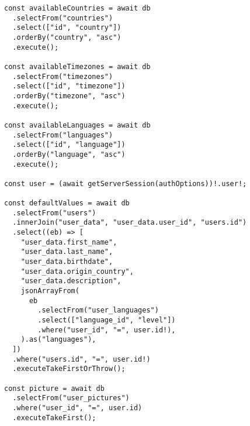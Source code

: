 
\begin{verbatim}
const availableCountries = await db
  .selectFrom("countries")
  .select(["id", "country"])
  .orderBy("country", "asc")
  .execute();

const availableTimezones = await db
  .selectFrom("timezones")
  .select(["id", "timezone"])
  .orderBy("timezone", "asc")
  .execute();

const availableLanguages = await db
  .selectFrom("languages")
  .select(["id", "language"])
  .orderBy("language", "asc")
  .execute();

const user = (await getServerSession(authOptions))!.user!;

const defaultValues = await db
  .selectFrom("users")
  .innerJoin("user_data", "user_data.user_id", "users.id")
  .select((eb) => [
    "user_data.first_name",
    "user_data.last_name",
    "user_data.birthdate",
    "user_data.origin_country",
    "user_data.description",
    jsonArrayFrom(
      eb
        .selectFrom("user_languages")
        .select(["language_id", "level"])
        .where("user_id", "=", user.id!),
    ).as("languages"),
  ])
  .where("users.id", "=", user.id!)
  .executeTakeFirstOrThrow();

const picture = await db
  .selectFrom("user_pictures")
  .where("user_id", "=", user.id)
  .executeTakeFirst();
\end{verbatim}
